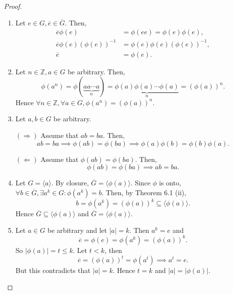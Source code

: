 \documentclass{article}
\theoremstyle{definition}
\begin{document}
 \begin{proof}
     \begin{enumerate}[label=(\roman*)]
         \item Let $e \in G, \overline{e} \in \overline{G}$. Then,
         \begin{align*}
            \overline{e}\phi(e) &= \phi(ee) = \phi(e)\phi(e), \\
            \overline{e}\phi(e)(\phi(e))^{-1} &= \phi(e)\phi(e)(\phi(e))^{-1}, \\
            \overline{e} &= \phi(e).
         \end{align*}
         
         \item Let $n \in \mathbb{Z}, a \in G$ be arbitrary. Then, 
         \begin{equation*}
             \phi(a^n) = \phi(\underbrace{aa \cdots a}_{n}) = \underbrace{\phi(a)\phi(a)\cdots \phi(a)}_{n} = (\phi(a))^n.
         \end{equation*}
         Hence $\forall n \in \mathbb{Z}, \forall a \in G, \phi(a^n) = (\phi(a))^n$.
         
         \item Let $a,b \in G$ be arbitrary.
         
         $(\Rightarrow)$ Assume that $ab=ba$. Then,
         \begin{equation*}
             ab = ba \implies \phi(ab) = \phi(ba) \implies \phi(a)\phi(b) = \phi(b)\phi(a).
         \end{equation*}
         
         $(\Leftarrow)$ Assume that $\phi(ab) = \phi(ba)$. Then,
         \begin{equation*}
             \phi(ab) = \phi(ba) \implies ab = ba.
         \end{equation*}
         
         \item Let $G = \langle a \rangle$. By closure, $\overline{G} = \langle \phi(a) \rangle$. Since $\phi$ is onto, $\forall b \in \overline{G}, \exists a^k \in G: \phi(a^k) = b$. Then, by Theorem 6.1 (ii),
         \begin{equation*}
             b = \phi(a^k) = (\phi(a))^k \subseteq \langle \phi(a) \rangle. 
         \end{equation*}
         Hence $\overline{G} \subseteq \langle \phi(a) \rangle$ and $\overline{G} = \langle \phi(a) \rangle$.
         
         \item Let $a \in G$ be arbitrary and let $|a|=k$. Then $a^k = e$ and
         \begin{equation*}
             \overline{e} = \phi(e) = \phi(a^k) = (\phi(a))^k.
         \end{equation*}
         So $|\phi(a)| = t \leq k$. Let $t < k$, then
         \begin{equation*}
             \overline{e} = (\phi(a))^t = \phi(a^t) \implies a^t = e.
         \end{equation*}
         But this contradicts that $|a|=k$. Hence $t=k$ and $|a| = |\phi(a)|$.
         

\end{enumerate}
\end{proof}
\end{document}
